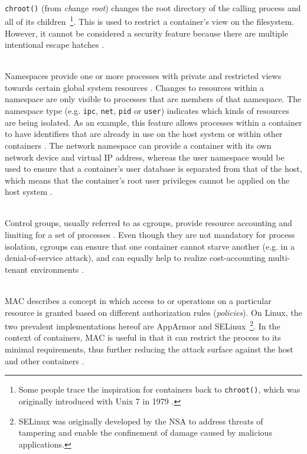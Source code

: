 \begin{description}[format={\storedescriptionlabel}]
  \item[Chroots\label{itm:chroots}]
  \hfill \\
  \texttt{chroot()} (from \textit{ch}ange \textit{root}) changes the root directory of the calling process and all of its children~\footnote{Some people trace the inspiration for containers back to \texttt{chroot()}, which was originally introduced with Unix 7 in 1979 \cite[p.~82]{bernstein2014containers}.}. This is used to restrict a container's view on the filesystem. However, it cannot be considered a security feature because there are multiple intentional escape hatches \cite[p.~3]{eder2016hypervisor}.

  \item[Namespaces]
  \hfill \\
  Namespaces provide one or more processes with private and restricted views towards certain global system resources \cite[p.~387]{morabito2015hypervisors}. Changes to resources within a namespace are only visible to processes that are members of that namespace. The namespace type (e.g. \texttt{ipc}, \texttt{net}, \texttt{pid} or \texttt{user}) indicates which kinds of resources are being isolated. As an example, this feature allows processes within a container to have identifiers that are already in use on the host system or within other containers \cite[p.~3] {eder2016hypervisor}. The network namespace can provide a container with its own network device and virtual \acs{IP} address, whereas the user namespace would be used to ensure that a container's user database is separated from that of the host, which means that the container's root user privileges cannot be applied on the host system \cite[p.~1]{merkel2014docker}.

  \item[Control groups]
  \hfill \\
  Control groups, usually referred to as cgroups, provide resource accounting and limiting for a set of processes  \cite[p.~387]{morabito2015hypervisors} \cite[p.~1]{merkel2014docker}. Even though they are not mandatory for process isolation, cgroups can ensure that one container cannot starve another (e.g. in a denial-of-service attack), and can equally help to realize cost-accounting multi-tenant environments \cite[p.~4]{eder2016hypervisor}.

  \item[Mandatory access control]
  \hfill \\
  \ac{MAC} describes a concept in which access to or operations on a particular resource is granted based on different authorization rules (\textit{policies}). On Linux, the two prevalent implementations hereof are AppArmor and \acs*{SELinux}~\footnote{\ac*{SELinux} was originally developed by the \acl*{NSA} to address threats of tampering and enable the confinement of damage caused by malicious applications.}. In the context of containers, \ac{MAC} is useful in that it can restrict the process to its minimal requirements, thus further reducing the attack surface against the host and other containers \cite[p.~4]{eder2016hypervisor}.
\end{description}


